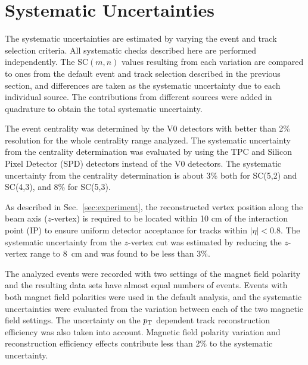 \section{Systematic Uncertainties}
\label{sec:uncertainties}



The systematic uncertainties are estimated by varying the event and track selection criteria. All systematic checks described here are performed independently. 
The SC$(m,n)$ values resulting from each variation are compared to ones from the default event and track selection described in the previous section,
and differences are taken as the systematic uncertainty due to each individual source.
The contributions from different sources were added in quadrature to obtain the total systematic uncertainty.

The event centrality was determined by the V0 detectors \cite{Abbas:2013taa} with better than 2\%  resolution for the whole centrality range analyzed. The systematic uncertainty from the centrality determination was evaluated by using the TPC and Silicon Pixel Detector (SPD) \cite{Dellacasa:1999kf} detectors instead of the V0 detectors. The systematic uncertainty from the centrality determination is about 3\% both for SC(5,2) and SC(4,3), and 8\% for  SC(5,3).

As described in Sec.~\ref{sec:experiment}, the reconstructed vertex position along the beam axis ($z$-vertex) is required to be located within 10 cm of the interaction point (IP) to ensure uniform detector acceptance for tracks within $|\eta|<0.8$. The systematic uncertainty from the $z$-vertex cut was estimated by reducing the $z$-vertex range to 8~cm and was found to be less than 3\%.  

The analyzed events were recorded with two settings of the magnet field polarity and the resulting data sets have almost equal numbers of events. Events with both magnet field polarities were used in the default analysis, and the systematic uncertainties were evaluated from the variation between each of the two magnetic field settings. 
The uncertainty on the $p_{\rm T}$ dependent track reconstruction efficiency was also taken into account.
Magnetic field polarity variation and reconstruction efficiency effects contribute less than 2\% to the systematic uncertainty.


